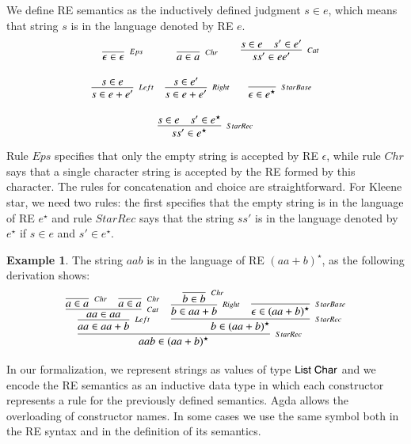\documentclass[review]{elsarticle}
\theoremstyle{definition}
\newtheorem{Example}{Example}
\newcommand{\D}[1]{\blue{\mathsf{#1}}}
\begin{document}
We define RE semantics as the inductively defined judgment $s \in e$, 
which means that string $s$ is in the language denoted by RE $e$.
\[
    \begin{array}{ccc}
        \infer[_{Eps}]{\epsilon \in \epsilon}{}
        & 
        \infer[_{Chr}]{a \in a}{}
        &
        \infer[_{Cat}]{ss' \in ee'}
                      {s \in e & s' \in e'} \\ \\
        \infer[_{Left}]{s \in e + e'}
                       {s \in e} & 
        \infer[_{Right}]{s \in e + e'}
                        {s \in e'} &
        \infer[_{StarBase}]{\epsilon \in e^\star}{} \\ \\ 
        \multicolumn{3}{c}{
            \infer[_{StarRec}]
                  {ss' \in e^\star}
                  {s \in e & s' \in e^\star}
        }
    \end{array}
\]
Rule $Eps$ specifies that only the empty string is accepted by RE $\epsilon$, while 
rule $Chr$ says that a single character string is accepted by the RE formed by this
character. The rules for concatenation and choice are straightforward. For Kleene star, 
we need two rules: the first specifies that the empty string is in the language of RE $e^\star$ and 
rule $StarRec$ says that the string $ss'$ is in the language denoted by $e^\star$ if 
$s \in e$ and $s' \in e^\star$.

\begin{Example}
    The string $aab$ is in the language of RE $(aa + b)^\star$, as the following derivation shows:
    \[
        \infer[_{StarRec}]{aab \in (aa + b)^\star}
              {
                  \infer[_{Left}]{aa \in aa + b}
                        {
                            \infer[_{Cat}]{aa \in aa}
                                  {
                                      \infer[_{Chr}]{a \in a}{} &
                                      \infer[_{Chr}]{a \in a}{}
                                  }
                        }
                  & 
                  \infer[_{StarRec}]{b \in (aa + b)^\star}
                        {
                            \infer[_{Right}]{b \in aa + b}
                                  {
                                      \infer[_{Chr}]{b \in b}{}
                                  }
                            & 
                            \infer[_{StarBase}]{\epsilon \in (aa + b)^\star}{}
                        }          
              }
    \]
\end{Example}
In our formalization, we represent strings as values of type \ensuremath{\D{List}\;\D{Char}} and we encode the RE semantics
as an inductive data type in which each constructor represents a rule for the previously defined semantics.
Agda allows the overloading of constructor names. In some cases we use the same symbol both 
in the RE syntax and in the definition of its semantics.
\end{document}
